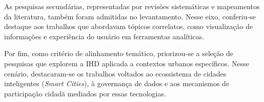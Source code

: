 \documentclass[
	12pt,				%
	oneside,			%
	a4paper,			%
	english,			%
	brazil				%
	]{abntex2ppgsi}
\begin{document}
   As pesquisas secundárias, representadas por revisões sistemáticas e mapeamentos da literatura, também foram admitidas no levantamento. Nesse eixo, conferiu-se destaque aos trabalhos que abordavam tópicos correlatos, como visualização de informações e experiência do usuário em ferramentas analíticas.

    Por fim, como critério de alinhamento temático, priorizou-se a seleção de pesquisas que explorem a IHD aplicada a contextos urbanos específicos. Nesse cenário, destacaram-se os trabalhos voltados ao ecossistema de cidades inteligentes (\textit{Smart Cities}), à governança de dados e aos mecanismos de participação cidadã mediados por essas tecnologias.
    


\end{document}

